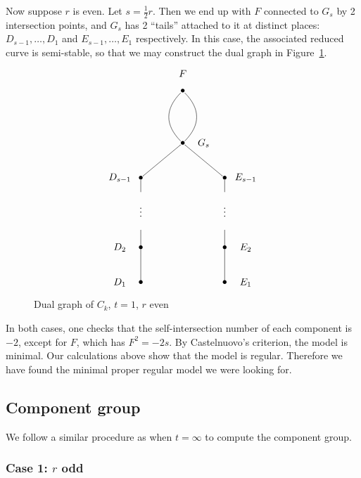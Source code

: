 \documentclass[reqno]{amsart}
\theoremstyle{definition}
\theoremstyle{remark}
\begin{document}
Now suppose $r$ is even. Let $s = \frac12 r$. Then we end up with $F$ connected to $G_s$ by 2 intersection points, and $G_s$ has 2 ``tails'' attached to it at distinct places: $D_{s-1}, \dots, D_1$ and $E_{s-1}, \dots, E_1$ respectively. In this case, the associated reduced curve is semi-stable, so that we may construct the dual graph in Figure~\ref{fig:superelliptic-dual-graph-even}.
\begin{figure}[h]\centering
\[
\xygraph{
  !{<0cm,0cm>;<1.5cm,0cm>:<0cm,1.25cm>::}
  !{(2,6) }*{F}
  !{(2,5.5) }*{\bullet}="f"
  !{(2,4) }*{\bullet}="g"
  !{(2.5,4) }*{G_s}
  !{(.5,3) }*{D_{s-1}}
  !{(1,3) }*{\bullet}="ds"
  !{(1,2.6) }*{}="dabove"
  !{(1,2.1) }*{\vdots}="dspace"
  !{(1,1.5) }*{}="dbelow"
  !{(1,1) }*{\bullet}="d2"
  !{(.5,1) }*{D_2}
  !{(1,0) }*{\bullet}="d1"
  !{(.5,0) }*{D_1}
  !{(3.5,3) }*{E_{s-1}}
  !{(3,3) }*{\bullet}="es"
  !{(3,2.6) }*{}="eabove"
  !{(3,2.1) }*{\vdots}="espace"
  !{(3,1.5) }*{}="ebelow"
  !{(3,1) }*{\bullet}="e2"
  !{(3.5,1) }*{E_2}
  !{(3,0) }*{\bullet}="e1"
  !{(3.5,0) }*{E_1}
  "f"-@/^0.5cm/"g"
  "f"-@/_0.5cm/"g"
  "g"-"ds"
  "ds"-"dabove"
  "dbelow"-"d2"
  "d2"-"d1"
  "g"-"es"
  "es"-"eabove"
  "ebelow"-"e2"
  "e2"-"e1"
}
\]
  \caption{Dual graph of $C_k$, $t=1$, $r$ even}
\label{fig:superelliptic-dual-graph-even}
\end{figure}

In both cases, one checks that the self-intersection number of each component is $-2$, except for $F$, which has $F^2 = -2s$. By Castelnuovo's criterion, the model is minimal. Our calculations above show that the model is regular. Therefore we have found the minimal proper regular model we were looking for.

\subsection{Component group}
\label{sec:component-group-t-equals-one}

We follow a similar procedure as when $t = \infty$ to compute the component group. 

\subsubsection{Case 1: $r$ odd}
\label{sec:case-1:-r-odd}
\end{document}
